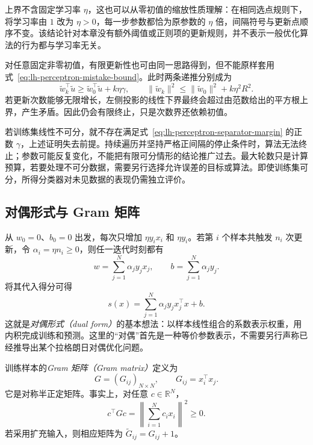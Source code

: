 上界不含固定学习率 $\eta$，这也可以从零初值的缩放性质理解：在相同选点规则下，将学习率由 $1$ 改为 $\eta>0$，每一步参数都恰为原参数的 $\eta$ 倍，间隔符号与更新点顺序不变。该结论针对本章没有额外阈值或正则项的更新规则，并不表示一般优化算法的行为都与学习率无关。

对任意固定非零初值，有限更新性也可由同一思路得到，但不能原样套用式~\eqref{eq:lh-perceptron-mistake-bound}。此时两条递推分别成为
\[
\widetilde w_k^\top\widetilde u
\geq\widetilde w_0^\top\widetilde u+k\eta\gamma,
\qquad
\|\widetilde w_k\|^2
\leq\|\widetilde w_0\|^2+k\eta^2R^2.
\]
若更新次数能够无限增长，左侧投影的线性下界最终会超过由范数给出的平方根上界，产生矛盾。因此仍会有限终止，只是次数界还依赖初值。

若训练集线性不可分，就不存在满足式~\eqref{eq:lh-perceptron-separator-margin} 的正数 $\gamma$，上述证明失去前提。持续遍历并坚持严格正间隔的停止条件时，算法无法终止；参数可能反复变化，不能把有限可分情形的结论推广过去。最大轮数只是计算预算，若要处理不可分数据，需要另行选择允许误差的目标或算法。即使训练集可分，所得分类器对未见数据的表现仍需独立评价。

\subsection{对偶形式与 Gram 矩阵}
\label{subsec:lh-perceptron-dual}

从 $w_0=0$、$b_0=0$ 出发，每次只增加 $\eta y_i x_i$ 和 $\eta y_i$。若第 $i$ 个样本共触发 $n_i$ 次更新，令 $\alpha_i=\eta n_i\geq0$，则任一迭代时刻都有
\begin{equation}
\label{eq:lh-perceptron-dual-representation}
w=\sum_{j=1}^{N}\alpha_jy_jx_j,
\qquad
b=\sum_{j=1}^{N}\alpha_jy_j.
\end{equation}
将其代入得分可得
\begin{equation}
\label{eq:lh-perceptron-dual-score}
s(x)=\sum_{j=1}^{N}\alpha_jy_jx_j^\top x+b.
\end{equation}
这就是\emph{对偶形式（dual form）}的基本想法：以样本线性组合的系数表示权重，用内积完成训练和预测。这里的“对偶”首先是一种等价参数表示，不需要另行声称已经推导出某个拉格朗日对偶优化问题。

\begin{definition}[Gram 矩阵]
\label{def:lh-perceptron-gram}
训练样本的\emph{Gram 矩阵（Gram matrix）}定义为
\begin{equation}
\label{eq:lh-perceptron-gram}
G=(G_{ij})_{N\times N},
\qquad G_{ij}=x_i^\top x_j.
\end{equation}
它是对称半正定矩阵。事实上，对任意 $c\in\mathbb R^N$，
\[
c^\top Gc
=\left\|\sum_{i=1}^{N}c_i x_i\right\|^2\geq0.
\]
若采用扩充输入，则相应矩阵为 $\widetilde G_{ij}=G_{ij}+1$。
\end{definition}

